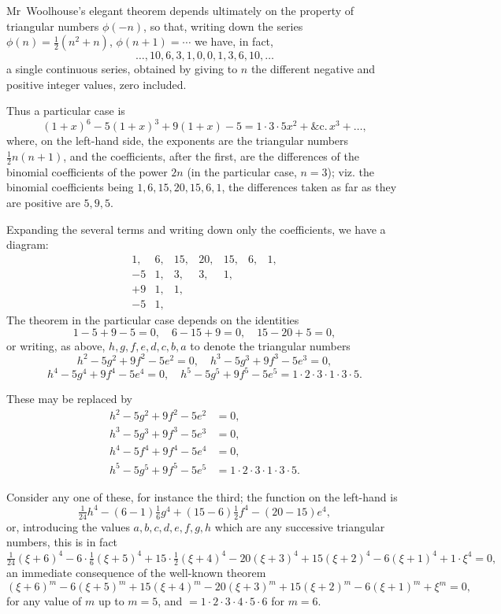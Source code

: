 \documentclass[11pt,a4paper]{book}
\begin{document}
\begin{solution}
Mr~Woolhouse's elegant theorem depends ultimately on the property of triangular numbers $\phi(-n)$, so that, writing down the series $\phi(n) = \frac{1}{2}(n^2+n)$, $\phi(n+1) = \cdots$ we have, in fact,
\[
\ldots, 10, 6, 3, 1, 0, 0, 1, 3, 6, 10, \ldots
\]
a single continuous series, obtained by giving to $n$ the different negative and positive integer values, zero included.

Thus a particular case is
\[
(1+x)^6 - 5(1+x)^3 + 9(1+x) - 5 = 1 \cdot 3 \cdot 5x^2 + \&\text{c.}\,x^3 + \ldots,
\]
where, on the left-hand side, the exponents are the triangular numbers $\frac{1}{2}n(n+1)$, and the coefficients, after the first, are the differences of the binomial coefficients of the power $2n$ (in the particular case, $n=3$); viz. the binomial coefficients being $1, 6, 15, 20, 15, 6, 1$, the differences taken as far as they are positive are $5, 9, 5$.

Expanding the several terms and writing down only the coefficients, we have a diagram:
\[
\begin{array}{rrrrrrr}
1, & 6, & 15, & 20, & 15, & 6, & 1, \\
-5 & 1, & 3, & 3, & 1, \\ 
+9 & 1, & 1, \\-5 & 1,
\end{array}
\]
The theorem in the particular case depends on the identities
\[
1-5+9-5 = 0, \quad 6-15+9=0, \quad 15-20+5=0,
\]
or writing, as above, $h,g,f,e,d,c,b,a$ to denote the triangular numbers
\[
h^2-5g^2+9f^2-5e^2=0, \quad h^3-5g^3+9f^3-5e^3=0,
\]
\[
h^4-5g^4+9f^4-5e^4=0, \quad h^5-5g^5+9f^5-5e^5=1\cdot2\cdot3\cdot1\cdot3\cdot5.
\]

These may be replaced by
\[
\begin{aligned}
h^2-5g^2+9f^2-5e^2 &= 0, \\
h^3-5g^3+9f^3-5e^3 &= 0, \\
h^4-5f^4+9f^4-5e^4 &= 0, \\
h^5-5g^5+9f^5-5e^5 &= 1\cdot2\cdot3\cdot1\cdot3\cdot5.
\end{aligned}
\]

Consider any one of these, for instance the third; the function on the left-hand is
\[
\tfrac{1}{24}h^4 - (6-1)\tfrac{1}{6}g^4 + (15-6)\tfrac{1}{2}f^4 - (20-15)e^4,
\]
or, introducing the values $a,b,c,d,e,f,g,h$ which are any successive triangular numbers, this is in fact
\[
\tfrac{1}{24}(\xi+6)^4 - 6\cdot\tfrac{1}{6}(\xi+5)^4 + 15\cdot\tfrac{1}{2}(\xi+4)^4 - 20(\xi+3)^4 + 15(\xi+2)^4 - 6(\xi+1)^4 + 1\cdot\xi^4 = 0,
\]
an immediate consequence of the well-known theorem
\[
(\xi+6)^m - 6(\xi+5)^m + 15(\xi+4)^m - 20(\xi+3)^m + 15(\xi+2)^m - 6(\xi+1)^m + \xi^m = 0,
\]
for any value of $m$ up to $m=5$, and $= 1\cdot2\cdot3\cdot4\cdot5\cdot6$ for $m=6$.


\end{solution}
\end{document}
